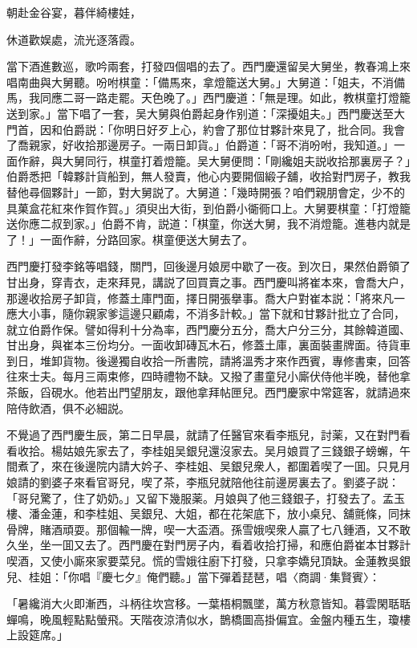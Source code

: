 朝赴金谷宴，暮伴綺樓娃，

休道歡娱處，流光逐落霞。

當下酒進數巡，歌吟兩套，打發四個唱的去了。西門慶還留吴大舅坐，教春鴻上來唱南曲與大舅聽。吩咐棋童：「備馬來，拿燈籠送大舅。」大舅道：「姐夫，不消備馬，我同應二哥一路走罷。天色晚了。」西門慶道：「無是理。如此，教棋童打燈籠送到家。」當下唱了一套，吴大舅與伯爵起身作别道：「深擾姐夫。」西門慶送至大門首，因和伯爵説：「你明日好歹上心，約會了那位甘夥計來見了，批合同。我會了喬親家，好收拾那邊房子。一兩日卸貨。」伯爵道：「哥不消吩咐，我知道。」一面作辭，與大舅同行，棋童打着燈籠。吴大舅便問：「剛纔姐夫説收拾那裏房子？」伯爵悉把「韓夥計貨船到，無人發賣，他心内要開個緞子舖，收拾對門房子，教我替他尋個夥計」一節，對大舅説了。大舅道：「幾時開張？咱們親朋會定，少不的具菓盒花紅來作賀作賀。」須臾出大街，到伯爵小衚衕口上。大舅要棋童：「打燈籠送你應二叔到家。」伯爵不肯，説道：「棋童，你送大舅，我不消燈籠。進巷内就是了！」一面作辭，分路回家。棋童便送大舅去了。

西門慶打發李銘等唱錢，關門，回後邊月娘房中歇了一夜。到次日，果然伯爵領了甘出身，穿青衣，走來拜見，講説了回買賣之事。西門慶叫將崔本來，會喬大户，那邊收拾房子卸貨，修蓋土庫門面，擇日開張擧事。喬大户對崔本説：「將來凡一應大小事，隨你親家爹這邊只顧䖏，不消多計較。」當下就和甘夥計批立了合同，就立伯爵作保。譬如得利十分為率，西門慶分五分，喬大户分三分，其餘韓道國、甘出身，與崔本三份均分。一面收卸磚瓦木石，修蓋土庫，裏面裝畫牌面。待貨車到日，堆卸貨物。後邊獨自收拾一所書院，請將溫秀才來作西賓，專修書柬，回答往來士夫。每月三兩束修，四時禮物不缺。又撥了畫童兒小廝伏侍他半晚，替他拿茶飯，舀硯水。他若出門望朋友，跟他拿拜帖匣兒。西門慶家中常筵客，就請過來陪侍飲酒，俱不必細説。

不覺過了西門慶生辰，第二日早晨，就請了任醫官來看李瓶兒，討薬，又在對門看看收拾。楊姑娘先家去了，李桂姐吴銀兒還沒家去。吴月娘買了三錢銀子螃蠏，午間煮了，來在後邊院内請大妗子、李桂姐、吴銀兒衆人，都圍着喫了一囬。只見月娘請的劉婆子來看官哥兒，喫了茶，李瓶兒就陪他往前邊房裏去了。劉婆子説：「哥兒驚了，住了奶奶。」又留下幾服薬。月娘與了他三錢銀子，打發去了。孟玉樓、潘金蓮，和李桂姐、吴銀兒、大姐，都在花架底下，放小桌兒、舖氈條，同抹骨牌，賭酒頑耍。那個輸一牌，喫一大盃酒。孫雪娥喫衆人贏了七八鍾酒，又不敢久坐，坐一囬又去了。西門慶在對門房子内，看着收拾打掃，和應伯爵崔本甘夥計喫酒，又使小廝來家要菜兒。慌的雪娥往廚下打發，只拿李嬌兒頂缺。金蓮教吳銀兒、桂姐：「你唱『慶七夕』俺們聽。」當下彈着琵琶，唱〈商調·集賢賓〉：

「暑纔消大火即漸西，斗柄往坎宫移。一葉梧桐飄墜，萬方秋意皆知。暮雲閑聒聒蟬鳴，晚風輕點點螢飛。天階夜涼清似水，鵲橋圖高掛偏宜。金盤内種五生，瓊樓上設筵席。」

